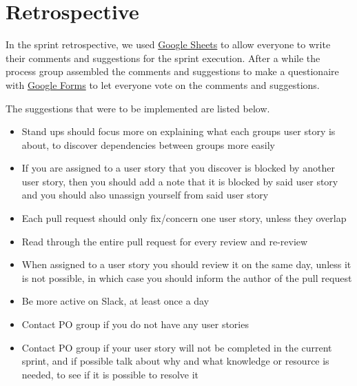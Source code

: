 \section{Retrospective}
In the sprint retrospective, we used \href{https://www.google.com/sheets/about/}{Google Sheets} to allow everyone to write their comments and suggestions for the sprint execution.
After a while the process group assembled the comments and suggestions to make a questionaire with \href{https://www.google.com/forms/about/}{Google Forms} to let everyone vote on the comments and suggestions.

The suggestions that were to be implemented are listed below.

\begin{itemize}
  \item Stand ups should focus more on explaining what each groups user story is about, to discover dependencies between groups more easily
  \item If you are assigned to a user story that you discover is blocked by another user story, then you should add a note that it is blocked by said user story and you should also unassign yourself from said user story
  \item Each pull request should only fix/concern one user story, unless they overlap
  \item Read through the entire pull request for every review and re-review
  \item When assigned to a user story you should review it on the same day, unless it is not possible, in which case you should inform the author of the pull request
  \item Be more active on Slack, at least once a day
  \item Contact PO group if you do not have any user stories
  \item Contact PO group if your user story will not be completed in the current sprint, and if possible talk about why and what knowledge or resource is needed, to see if it is possible to resolve it
\end{itemize}



